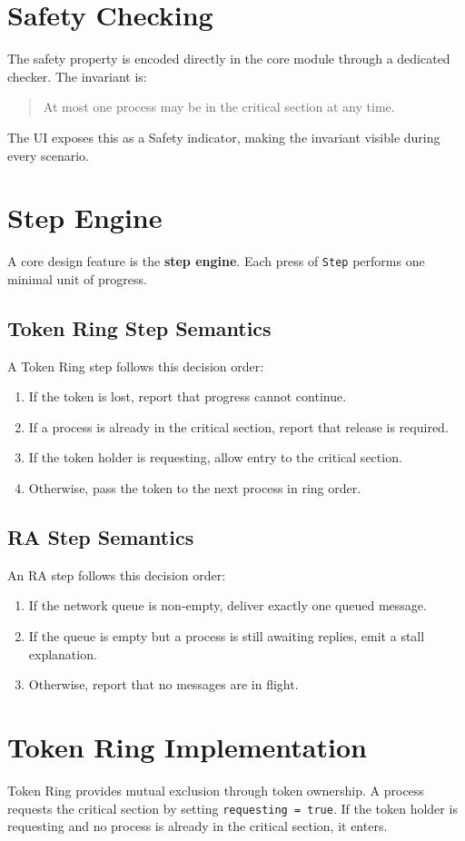 \section{Safety Checking}
The safety property is encoded directly in the core module through a dedicated checker. The invariant is:
\begin{quote}
At most one process may be in the critical section at any time.
\end{quote}
The UI exposes this as a Safety indicator, making the invariant visible during every scenario.

\section{Step Engine}
A core design feature is the \textbf{step engine}. Each press of \texttt{Step} performs one minimal unit of progress.

\subsection{Token Ring Step Semantics}
A Token Ring step follows this decision order:
\begin{enumerate}
  \item If the token is lost, report that progress cannot continue.
  \item If a process is already in the critical section, report that release is required.
  \item If the token holder is requesting, allow entry to the critical section.
  \item Otherwise, pass the token to the next process in ring order.
\end{enumerate}

\subsection{RA Step Semantics}
An RA step follows this decision order:
\begin{enumerate}
  \item If the network queue is non-empty, deliver exactly one queued message.
  \item If the queue is empty but a process is still awaiting replies, emit a stall explanation.
  \item Otherwise, report that no messages are in flight.
\end{enumerate}

\section{Token Ring Implementation}
Token Ring provides mutual exclusion through token ownership. A process requests the critical section by setting \texttt{requesting = true}. If the token holder is requesting and no process is already in the critical section, it enters.

